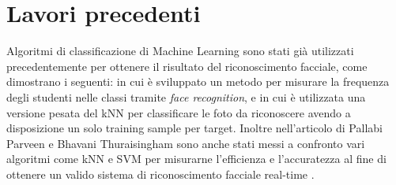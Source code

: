 \section{Lavori precedenti}
Algoritmi di classificazione di Machine Learning sono stati già utilizzati precedentemente per ottenere il risultato del riconoscimento facciale, come dimostrano i seguenti: \cite{santoso2017efficient} in cui è sviluppato un metodo per misurare la frequenza degli studenti nelle classi tramite \textit{face recognition}, e \cite{farsi2014fast} in cui è utilizzata una versione pesata del kNN per classificare le foto da riconoscere avendo a disposizione un solo training sample per target. Inoltre nell'articolo di Pallabi Parveen e Bhavani Thuraisingham sono anche stati messi a confronto vari algoritmi come kNN e SVM per misurarne l'efficienza e l'accuratezza al fine di ottenere un valido sistema di riconoscimento facciale real-time \cite{parveen2006face}.

